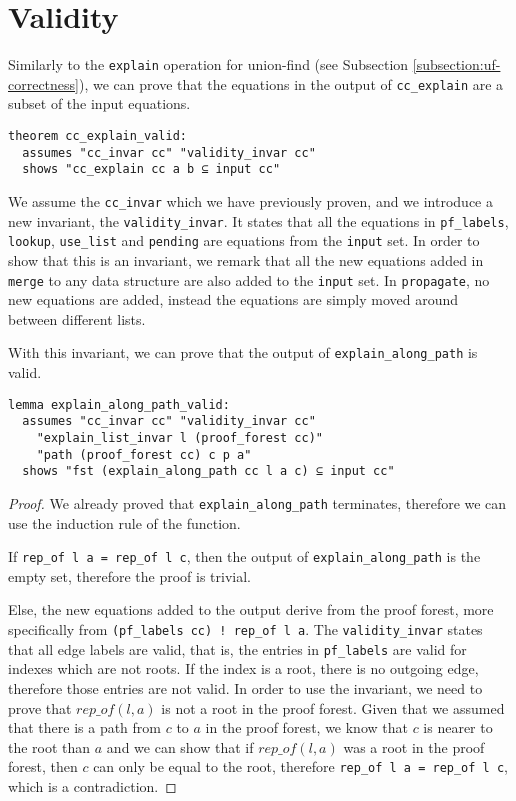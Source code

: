 \section{Validity}

Similarly to the \lstinline{explain} operation for union-find (see Subsection \ref{subsection:uf-correctness}), we can prove that the equations in the output of \lstinline{cc_explain} are a subset of the input equations.

\begin{lstlisting}
theorem cc_explain_valid:
  assumes "cc_invar cc" "validity_invar cc"
  shows "cc_explain cc a b ⊆ input cc"
\end{lstlisting}

We assume the \lstinline{cc_invar} which we have previously proven, and we introduce a new invariant, the \lstinline{validity_invar}. It states that all the equations in \lstinline{pf_labels}, \lstinline{lookup}, \lstinline{use_list} and \lstinline{pending} are equations from the \lstinline{input} set. In order to show that this is an invariant, we remark that all the new equations added in \lstinline{merge} to any data structure are also added to the \lstinline{input} set. In \lstinline{propagate}, no new equations are added, instead the equations are simply moved around between different lists.

With this invariant, we can prove that the output of \lstinline{explain_along_path} is valid.

\begin{lstlisting}
lemma explain_along_path_valid:
  assumes "cc_invar cc" "validity_invar cc"
    "explain_list_invar l (proof_forest cc)"
    "path (proof_forest cc) c p a"
  shows "fst (explain_along_path cc l a c) ⊆ input cc"
\end{lstlisting}

\begin{proof}
We already proved that \lstinline{explain_along_path} terminates, therefore we can use the induction rule of the function.

If \lstinline{rep_of l a = rep_of l c}, then the output of \lstinline{explain_along_path} is the empty set, therefore the proof is trivial.

Else, the new equations added to the output derive from the proof forest, more specifically from \lstinline{(pf_labels cc) ! rep_of l a}.
The \lstinline{validity_invar} states that all edge labels are valid, that is, the entries in \lstinline|pf_labels| are valid for indexes which are not roots. If the index is a root, there is no outgoing edge, therefore those entries are not valid.
In order to use the invariant, we need to prove that $rep\_of(l, a)$ is not a root in the proof forest.
Given that we assumed that there is a path from $c$ to $a$ in the proof forest, we know that $c$ is nearer to the root than $a$ and we can show that if $rep\_of(l,a)$ was a root in the proof forest, then $c$ can only be equal to the root, therefore \lstinline{rep_of l a = rep_of l c}, which is a contradiction.
\end{proof}

